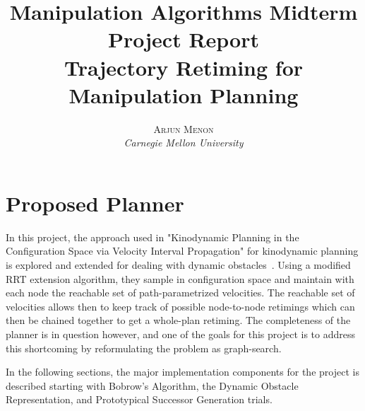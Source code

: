 \documentclass[letterpaper,10pt]{article} %
\title{\textbf{Manipulation Algorithms Midterm Project Report}\\ %
Trajectory Retiming for Manipulation Planning} %
\author{\textsc{Arjun Menon} %
\\{\textit{Carnegie Mellon University}}} %
\makeatletter
\renewcommand{\maketitle}{ %
\begin{flushright} %
{\LARGE\@title} %

\vspace{5pt} %

{\large\@author} %
\vspace{0pt} %
\end{flushright}
}
\makeatother
\begin{document}
\maketitle %



%
%
%


\section{Proposed Planner}\label{sec:proposed}

In this project, the approach used in "Kinodynamic Planning in the Configuration Space via Velocity Interval Propagation" for kinodynamic planning is explored and extended for dealing with dynamic obstacles~\cite{pham2013velocity}. Using a modified RRT extension algorithm, they sample in configuration space and maintain with each node the reachable set of path-parametrized velocities. The reachable set of velocities allows then to keep track of possible node-to-node retimings which can then be chained together to get a whole-plan retiming. The completeness of the planner is in question however, and one of the goals for this project is to address this shortcoming by reformulating the problem as graph-search.

In the following sections, the major implementation components for the project is described starting with Bobrow's Algorithm, the Dynamic Obstacle Representation, and Prototypical Successor Generation trials.
\end{document}
